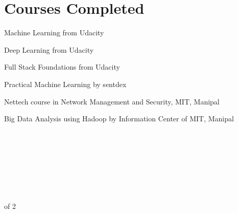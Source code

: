 \documentclass[]{deedy-resume-openfont}
\begin{document}
\begin{minipage}[]{1\textwidth}
\section{Courses Completed} 
\vspace{0.2cm}
\begin{tightemize}
\item \normalsize Machine Learning from Udacity
\item \normalsize Deep Learning from Udacity
\item \normalsize Full Stack Foundations from Udacity
\item \normalsize Practical Machine Learning by sentdex
\item \normalsize Nettech course in Network Management and Security, MIT, Manipal
\item \normalsize Big Data Analysis using Hadoop by Information Center of MIT, Manipal
\end{tightemize}
\sectionsep
\hfill \\
\hfill \\
\hfill \\
\hfill \\
\hfill \\
\hfill \\
\hfill \\
\vspace{0.15cm}
\footnotesize {} of 2
\end{minipage}



\end{document}

